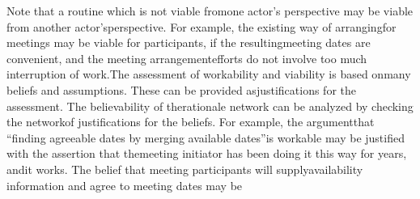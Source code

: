 Note that a routine which is not viable fromone actor’s perspective may be viable from another actor’sperspective. For example, the existing way of arrangingfor meetings may be viable for participants, if the resultingmeeting dates are convenient, and the meeting arrangementefforts do not involve too much interruption of work.The assessment of workability and viability is based onmany beliefs and assumptions. These can be provided asjustiﬁcations for the assessment. The believability of therationale network can be analyzed by checking the networkof justiﬁcations for the beliefs. For example, the argumentthat “ﬁnding agreeable dates by merging available dates”is workable may be justiﬁed with the assertion that themeeting initiator has been doing it this way for years, andit works. The belief that meeting participants will supplyavailability information and agree to meeting dates may be
